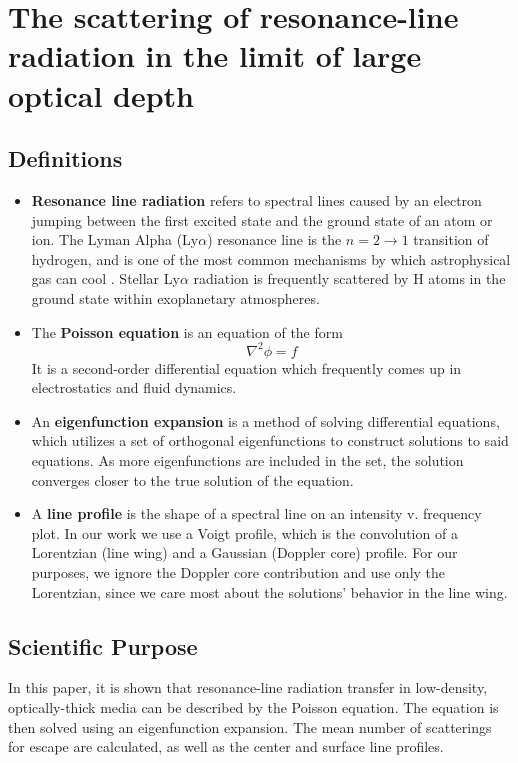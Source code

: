 \documentclass[onecolumn]{aastex63}
\begin{document}
\section{The scattering of resonance-line radiation in the limit of large optical depth}
\begin{centering}

\cite{harrington1973}

\end{centering}


\subsection{Definitions}
\begin{itemize}
    \item \textbf{Resonance line radiation} refers to spectral lines caused by an electron jumping between the first excited state and the ground state of an atom or ion. The Lyman Alpha (Ly$\alpha$) resonance line is the $n=2\rightarrow1$ transition of hydrogen, and is one of the most common mechanisms by which astrophysical gas can cool \citep{neufeld1990}. Stellar Ly$\alpha$ radiation is frequently scattered by H atoms in the ground state within exoplanetary atmospheres.
    \item The \textbf{Poisson equation} is an equation of the form
    \begin{equation}
        \nabla^2 \phi = f
    \end{equation}
    It is a second-order differential equation which frequently comes up in electrostatics and fluid dynamics.
    \item An \textbf{eigenfunction expansion} is a method of solving differential equations, which utilizes a set of orthogonal eigenfunctions to construct solutions to said equations. As more eigenfunctions are included in the set, the solution converges closer to the true solution of the equation.
    \item A \textbf{line profile} is the shape of a spectral line on an intensity v. frequency plot. In our work we use a Voigt profile, which is the convolution of a Lorentzian (line wing) and a Gaussian (Doppler core) profile. For our purposes, we ignore the Doppler core contribution and use only the Lorentzian, since we care most about the solutions' behavior in the line wing.
\end{itemize}


\subsection{Scientific Purpose}
In this paper, it is shown that resonance-line radiation transfer in low-density, optically-thick media can be described by the Poisson equation. The equation is then solved using an eigenfunction expansion. The mean number of scatterings for escape are calculated, as well as the center and surface line profiles.
\end{document}
